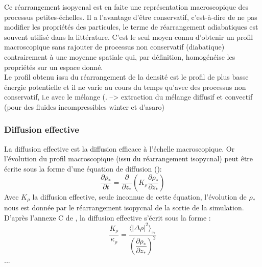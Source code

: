 \documentclass[a4paper,12pt]{article}
\begin{document}
        \newline
        Ce réarrangement isopycnal est en faite une représentation macroscopique des processus petites-échelles. Il a l'avantage d'être conservatif, c'est-à-dire de ne pas modifier les propriétés des particules, le terme de réarrangement adiabatiques est souvent utilisé dans la littérature. C'est le seul moyen connu d'obtenir un profil macroscopique sans rajouter de processus non conservatif (diabatique) contrairement à une moyenne spatiale qui, par définition, homogénéise les propriétés sur un espace donné. \\
        Le profil obtenu issu du réarrangement de la densité est le profil de plus basse énergie potentielle et il ne varie au cours du temps qu'avec des processus non conservatif, i.e avec le mélange (\cite*{winters_diascalar_1996}. --> extraction du mélange diffusif et convectif (pour des fluides incompressibles winter et d'asaro)
        
        
        \subsubsection{Diffusion effective}
        
        La diffusion effective est la diffusion efficace à l'échelle macroscopique. Or l'évolution du profil macroscopique (issu du réarrangement isopycnal) peut être écrite sous la forme d'une équation de diffusion (\citep{penney_diapycnal_2020-1}): 
        \begin{equation}
            \label{rho*}
            \frac{\partial\rho_*}{\partial t}=\frac{\partial}{\partial z_*}(K_{\rho}\frac{\partial\rho_*}{\partial z_*})
        \end{equation}
        Avec $K_{\rho}$ la diffusion effective, seule inconnue de cette équation, l'évolution de $\rho_*$ nous est donnée par le réarrangement isopycnal de la sortie de la simulation. D'après l'annexe C de \citep{penney_diapycnal_2020}, la diffusion effective s'écrit sous la forme :
        \begin{equation}
            \label{Keff}
            \frac{K_{\rho}}{\kappa_{\rho}}=\frac{\langle\vert\Delta\rho\vert^2\rangle_{z_*}}{(\dfrac{\partial\rho_*}{\partial z_*})^2}
        \end{equation}
         ...
        
        
\end{document}
